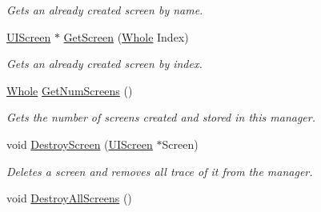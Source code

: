 \begin{DoxyCompactItemize}
\begin{DoxyCompactList}\small\item\em Gets an already created screen by name. \item\end{DoxyCompactList}\item 
\hyperlink{classphys_1_1UIScreen}{UIScreen} $\ast$ \hyperlink{classphys_1_1UIManager_a6083b86b2e240cc316e8ca87479d15a8}{GetScreen} (\hyperlink{namespacephys_a460f6bc24c8dd347b05e0366ae34f34a}{Whole} Index)
\begin{DoxyCompactList}\small\item\em Gets an already created screen by index. \item\end{DoxyCompactList}\item 
\hyperlink{namespacephys_a460f6bc24c8dd347b05e0366ae34f34a}{Whole} \hyperlink{classphys_1_1UIManager_a3bd28c361f6fc79a182ebd3ec0a26ec7}{GetNumScreens} ()
\begin{DoxyCompactList}\small\item\em Gets the number of screens created and stored in this manager. \item\end{DoxyCompactList}\item 
void \hyperlink{classphys_1_1UIManager_a5afab78f58a6531fc18771f5a4eeccf8}{DestroyScreen} (\hyperlink{classphys_1_1UIScreen}{UIScreen} $\ast$Screen)
\begin{DoxyCompactList}\small\item\em Deletes a screen and removes all trace of it from the manager. \item\end{DoxyCompactList}\item 
\hypertarget{classphys_1_1UIManager_a97555e02aad6c85cac6bf67fbe074cd1}{
void \hyperlink{classphys_1_1UIManager_a97555e02aad6c85cac6bf67fbe074cd1}{DestroyAllScreens} ()}
\label{d5/dc5/classphys_1_1UIManager_a97555e02aad6c85cac6bf67fbe074cd1}


\end{DoxyCompactItemize}
